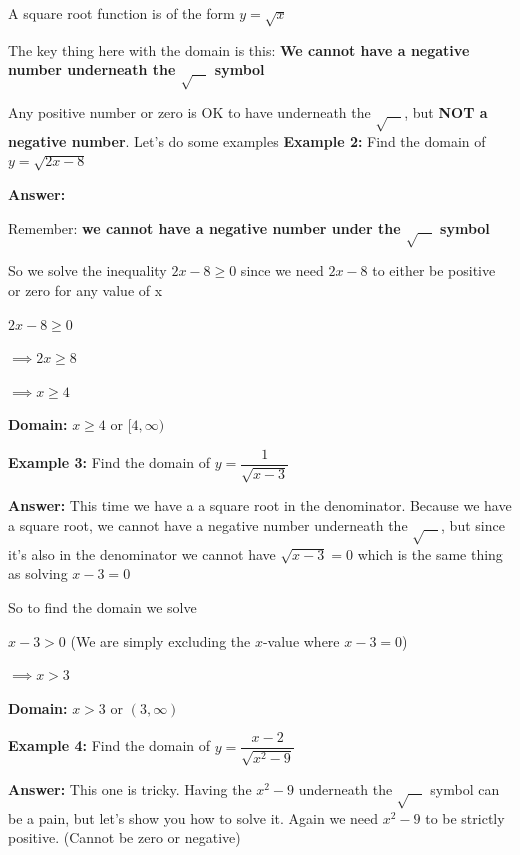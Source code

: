 \documentclass[12pt]{article}
\begin{document}
\begin{enumerate}
A square root function is of the form $y = \sqrt{x}$

The key thing here with the domain is this: \textbf{We cannot have a negative number underneath the $\sqrt{\hspace{1em}}$ symbol}

Any positive number or zero is OK to have underneath the $\sqrt{\hspace{1em}}$, but \textbf{NOT a negative number}. Let's do some examples
\newpage
\textbf{Example 2:} Find the domain of $y = \sqrt{2x-8}$

\textbf{Answer:} 

Remember: \textbf{we cannot have a negative number under the $\sqrt{\hspace{1em}}$ symbol}

So we solve the inequality $2x-8 \geq 0$ since we need $2x-8$ to either be positive or zero for any value of x

\hspace{1cm}$2x-8 \geq 0$

\hspace{.65cm}$\implies 2x \geq 8$

\hspace{.8cm}$\implies x \geq 4$

\textbf{Domain:} $x \geq 4$ or $[4, \infty)$

\textbf{Example 3:} Find the domain of $y = \dfrac{1}{\sqrt{x-3}}$

\textbf{Answer:} This time we have a a square root in the denominator. Because we have a square root, we cannot have a negative number underneath the $\sqrt{\hspace{1em}}$, but since it's also in the denominator we cannot have $\sqrt{x-3} = 0$ which is the same thing as solving $x-3 = 0$

So to find the domain we solve

\hspace{.5cm}$x-3 > 0$ \hspace{1cm} (We are simply excluding the $x$-value where $x-3 = 0$)

$\implies x > 3$

\textbf{Domain:} $x > 3$ or $(3, \infty)$
\newpage

\textbf{Example 4:} Find the domain of $y = \dfrac{x-2}{\sqrt{x^2-9}}$

\textbf{Answer:} This one is tricky. Having the $x^2 - 9$ underneath the $\sqrt{\hspace{1em}}$ symbol can be a pain, but let's show you how to solve it. Again we need $x^2 - 9$ to be strictly positive. (Cannot be zero or negative)


\end{enumerate}
\end{document}
